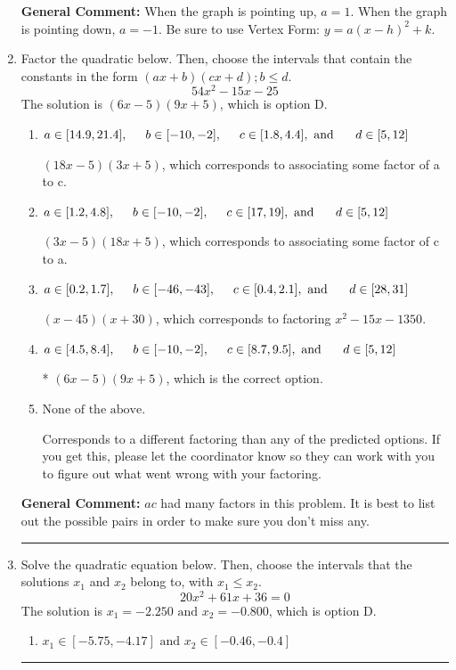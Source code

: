 \documentclass{extbook}[14pt]
\newcommand{\litem}[1]{\item #1

\rule{\textwidth}{0.4pt}}
\begin{document}
\begin{enumerate}
{\textbf{General Comment:} When the graph is pointing up, $a=1$. When the graph is pointing down, $a=-1$. Be sure to use Vertex Form: $y = a(x-h)^2+k$.
}
\litem{
Factor the quadratic below. Then, choose the intervals that contain the constants in the form $(ax+b)(cx+d); b \leq d.$
\[ 54x^{2} -15 x -25 \]The solution is \( (6x -5)(9x + 5) \), which is option D.\begin{enumerate}[label=\Alph*.]
\item \( a \in [14.9, 21.4], \hspace*{5mm} b \in [-10, -2], \hspace*{5mm} c \in [1.8, 4.4], \text{ and } \hspace*{5mm} d \in [5, 12] \)

 $(18x -5)(3x + 5)$, which corresponds to associating some factor of a to c.
\item \( a \in [1.2, 4.8], \hspace*{5mm} b \in [-10, -2], \hspace*{5mm} c \in [17, 19], \text{ and } \hspace*{5mm} d \in [5, 12] \)

 $(3x -5)(18x + 5)$, which corresponds to associating some factor of c to a.
\item \( a \in [0.2, 1.7], \hspace*{5mm} b \in [-46, -43], \hspace*{5mm} c \in [0.4, 2.1], \text{ and } \hspace*{5mm} d \in [28, 31] \)

 $(x -45)(x + 30)$, which corresponds to factoring $x^{2} -15 x -1350$.
\item \( a \in [4.5, 8.4], \hspace*{5mm} b \in [-10, -2], \hspace*{5mm} c \in [8.7, 9.5], \text{ and } \hspace*{5mm} d \in [5, 12] \)

* $(6x -5)(9x + 5)$, which is the correct option.
\item \( \text{None of the above.} \)

 Corresponds to a different factoring than any of the predicted options. If you get this, please let the coordinator know so they can work with you to figure out what went wrong with your factoring.
\end{enumerate}

\textbf{General Comment:} $ac$ had many factors in this problem. It is best to list out the possible pairs in order to make sure you don't miss any.
}
\litem{
Solve the quadratic equation below. Then, choose the intervals that the solutions $x_1$ and $x_2$ belong to, with $x_1 \leq x_2$.
\[ 20x^{2} +61 x + 36 = 0 \]The solution is \( x_1 = -2.250 \text{ and } x_2 = -0.800 \), which is option D.\begin{enumerate}[label=\Alph*.]
\item \( x_1 \in [-5.75, -4.17] \text{ and } x_2 \in [-0.46, -0.4] \)


\end{enumerate}}
\end{enumerate}
\end{document}
